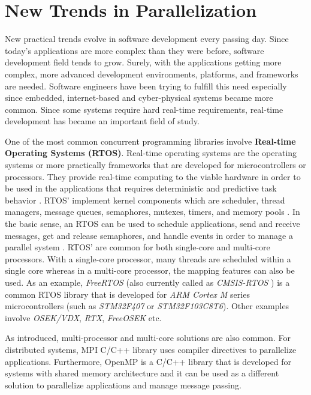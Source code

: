 \section{New Trends in Parallelization} %
New practical trends evolve in software development every passing day. Since today's applications are more complex than they were before, software development field tends to grow. Surely, with the applications getting more complex, more advanced development environments, platforms, and frameworks are needed. Software engineers have been trying to fulfill this need especially since embedded, internet-based and cyber-physical systems became more common. Since some systems require hard real-time requirements, real-time development has became an important field of study.

One of the most common concurrent programming libraries involve \textbf{Real-time Operating Systems (RTOS)}.  Real-time operating systems are the operating systems or more practically frameworks that are developed for microcontrollers or processors. They provide real-time computing to the viable hardware in order to be used in the applications that requires deterministic and predictive task behavior \cite{rtos1}. RTOS' implement kernel components which are scheduler, thread managers, message queues, semaphores, mutexes, timers, and memory pools \cite{rtos1}. In the basic sense, an RTOS can be used to schedule applications, send and receive messages, get and release semaphores, and handle events in order to manage a parallel system \cite{rtos1}. RTOS' are common for both single-core and multi-core processors. With a single-core processor, many threads are scheduled within a single core whereas in a multi-core processor, the mapping features can also be used. As an example, \textit{FreeRTOS} (also currently called as \textit{CMSIS-RTOS} \cite{cmsisRTOS}) is a common RTOS library that is developed for \textit{ARM Cortex M} series microcontrollers (such as \textit{STM32F407} or \textit{STM32F103C8T6}). Other examples involve \textit{OSEK/VDX},  \textit{RTX}, \textit{FreeOSEK} etc.

As introduced, multi-processor and multi-core solutions are also common. For distributed systems, MPI C/C++ library uses compiler directives to parallelize applications. Furthermore, OpenMP is a C/C++ library that is developed for systems with shared memory architecture and it can be used as a different solution to parallelize applications and manage message passing. 

